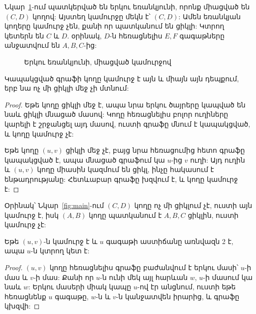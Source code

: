 \begin{example}\label{ex:two}
Նկար~\ref{fig:two}-ում պատկերված են երկու եռանկյունի, որոնք միացված են $(C,D)$ կողով: Այստեղ կամուրջը մեկն է՝ $(C,D)$: Ամեն եռանկյան կողերը կամուրջ չեն, քանի որ պատկանում են ցիկլի: Կտրող կետերն են $C$ և $D$. օրինակ, $D$-ն հեռացնելիս $E,F$ գագաթները անջատվում են $A,B,C$-ից:
\end{example}

\begin{figure}[h]
\centering
{}
\caption{Երկու եռանկյունի, միացված կամուրջով}\label{fig:two}
\end{figure}

\begin{theorem}
Կապակցված գրաֆի կողը կամուրջ է այն և միայն այն դեպքում, երբ նա ոչ մի ցիկլի մեջ չի մտնում:
\end{theorem}

\begin{proof}
Եթե կողը ցիկլի մեջ է, ապա նրա երկու ծայրերը կապված են նաև ցիկլի մնացած մասով: Կողը հեռացնելիս բոլոր ուղիները կարելի է շրջանցել այդ մասով, ուստի գրաֆը մնում է կապակցված, և կողը կամուրջ չէ:

Եթե կողը $(u,v)$ ցիկլի մեջ չէ, բայց նրա հեռացումից հետո գրաֆը կապակցված է, ապա մնացած գրաֆում կա $u$-ից $v$ ուղի: Այդ ուղին և $(u,v)$ կողը միասին կազմում են ցիկլ, ինչը հակասում է ենթադրությանը: Հետևաբար գրաֆը խզվում է, և կողը կամուրջ է:
\end{proof}

Օրինակ՝ Նկար~\ref{fig:main}-ում $(C,D)$ կողը ոչ մի ցիկլում չէ, ուստի այն կամուրջ է, իսկ $(A,B)$ կողը պատկանում է $A,B,C$ ցիկլին, ուստի կամուրջ չէ:

\begin{theorem}
Եթե $(u,v)$-ն կամուրջ է և $u$ գագաթի աստիճանը առնվազն 2 է, ապա $u$-ն կտրող կետ է:
\end{theorem}

\begin{proof}
$(u,v)$ կողը հեռացնելիս գրաֆը բաժանվում է երկու մասի՝ $u$-ի մաս և $v$-ի մաս: Քանի որ $u$-ն ունի մեկ այլ հարևան $w$, $u$-ի մասում կա նաև $w$: Երկու մասերի միակ կապը $u$-ով էր անցնում, ուստի եթե հեռացնենք $u$ գագաթը, $w$-ն և $v$-ն կանջատվեն իրարից, և գրաֆը կխզվի:
\end{proof}

